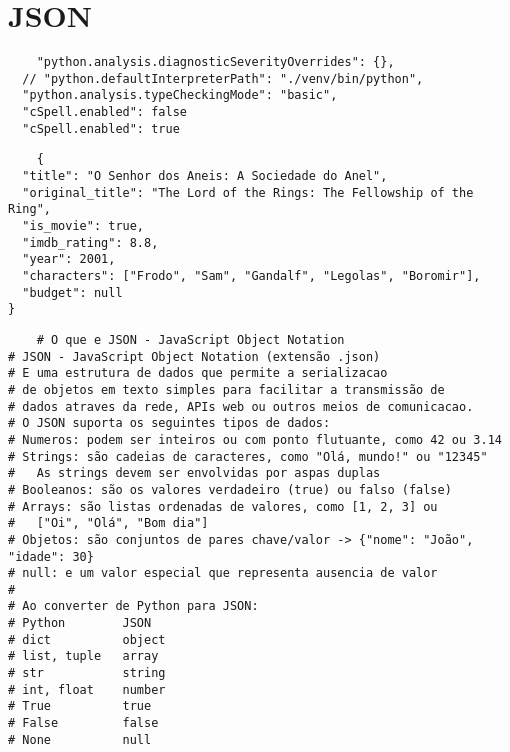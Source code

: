 \documentclass{article}
\begin{document}
\section{JSON}
\begin{lstlisting}
    "python.analysis.diagnosticSeverityOverrides": {},
  // "python.defaultInterpreterPath": "./venv/bin/python",
  "python.analysis.typeCheckingMode": "basic",
  "cSpell.enabled": false
  "cSpell.enabled": true

\end{lstlisting}

\begin{lstlisting}
    {
  "title": "O Senhor dos Aneis: A Sociedade do Anel",
  "original_title": "The Lord of the Rings: The Fellowship of the Ring",
  "is_movie": true,
  "imdb_rating": 8.8,
  "year": 2001,
  "characters": ["Frodo", "Sam", "Gandalf", "Legolas", "Boromir"],
  "budget": null
}
\end{lstlisting}

\begin{lstlisting}
    # O que e JSON - JavaScript Object Notation
# JSON - JavaScript Object Notation (extensão .json)
# E uma estrutura de dados que permite a serializacao
# de objetos em texto simples para facilitar a transmissão de
# dados atraves da rede, APIs web ou outros meios de comunicacao.
# O JSON suporta os seguintes tipos de dados:
# Numeros: podem ser inteiros ou com ponto flutuante, como 42 ou 3.14
# Strings: são cadeias de caracteres, como "Olá, mundo!" ou "12345"
#   As strings devem ser envolvidas por aspas duplas
# Booleanos: são os valores verdadeiro (true) ou falso (false)
# Arrays: são listas ordenadas de valores, como [1, 2, 3] ou
#   ["Oi", "Olá", "Bom dia"]
# Objetos: são conjuntos de pares chave/valor -> {"nome": "João", "idade": 30}
# null: e um valor especial que representa ausencia de valor
#
# Ao converter de Python para JSON:
# Python        JSON
# dict          object
# list, tuple   array
# str           string
# int, float    number
# True          true
# False         false
# None          null
\end{lstlisting}
\end{document}
